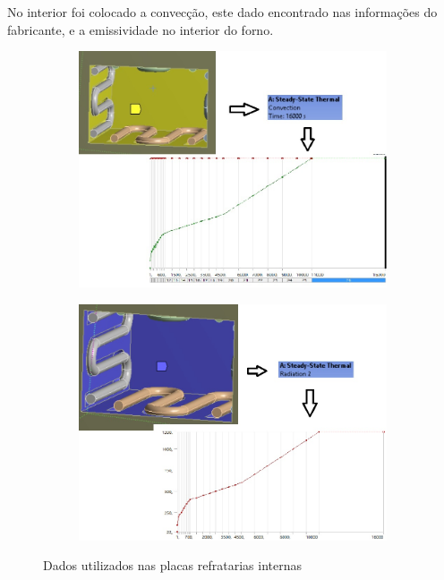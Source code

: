 No interior foi colocado a convecção, este dado encontrado nas informações do fabricante, e
a emissividade no interior do forno.
\begin{figure}[ht]
\centering
    \begin{subfigure}{0.49\linewidth} \centering
        \includegraphics[scale=0.5]{figuras/ansys4.jpg}
        \label{ansys4}
    \end{subfigure}
    \begin{subfigure}{0.49\linewidth} \centering
        \includegraphics[scale=0.5]{figuras/ansys7.jpg}
        \label{ansys7}
    \end{subfigure}
    \caption{Dados utilizados nas placas refratarias internas}
\end{figure}

